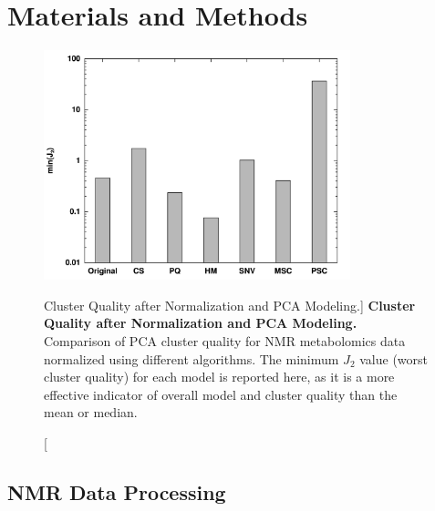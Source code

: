 \section{Materials and Methods}

\begin{figure}
\includegraphics[width=3.5in]{figs/pscorr/01-minj2.png}
\caption
      [Cluster Quality after Normalization and PCA Modeling.]{
  {\bf Cluster Quality after Normalization and PCA Modeling.}
  \\
  Comparison of PCA cluster quality for \hnmr{} NMR metabolomics data
  normalized using different algorithms. The minimum $J_2$ value (worst
  cluster quality) for each model is reported here, as it is a more effective
  indicator of overall model and cluster quality than the mean or median.
}
\end{figure}

\subsection{NMR Data Processing}


